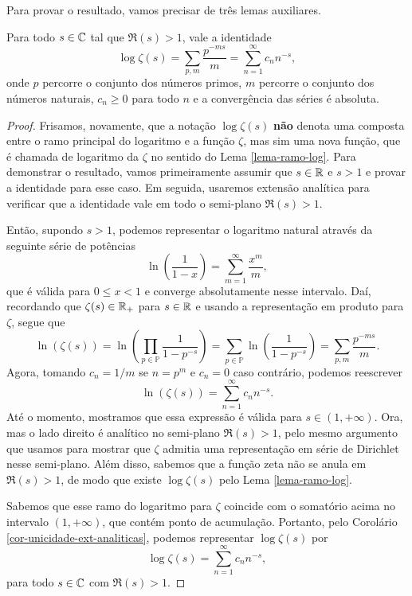     Para provar o resultado, vamos precisar de três lemas
    auxiliares.
    \begin{lema}
    \label{lema-log-zeta}
        Para todo $s\in\mathbb{C}$ tal que $\Re(s)>1$, vale a identidade
        \[
        \log\zeta(s) = \sum_{p,m} \frac{p^{-ms}}{m} 
                     = \sum_{n=1}^{\infty} c_nn^{-s},
        \]
        onde $p$ percorre o conjunto dos números primos, 
        $m$ percorre o conjunto dos números naturais,
        $c_n\geq 0$ para todo $n$ e a convergência das séries
        é absoluta.
    \end{lema}
    \begin{proof}
        Frisamos, novamente, que a notação $\log\zeta(s)$ \textbf{não} denota uma composta
        entre o ramo principal do logaritmo e a função $\zeta$, mas sim uma nova função, que
        é chamada de logaritmo da $\zeta$ no sentido do Lema \ref{lema-ramo-log}. 
        Para demonstrar o resultado, vamos primeiramente assumir que $s\in\mathbb{R}$ e $s>1$ e provar
        a identidade para esse caso. Em seguida, usaremos extensão analítica para verificar que a
        identidade vale em todo o semi-plano $\Re(s)>1$.
        
        Então, supondo $s>1$, podemos representar o logaritmo natural através da seguinte série 
        de potências
        \[
        \ln\left( \frac{1}{1-x} \right) = \sum_{m=1}^{\infty} \frac{x^m}{m},
        \]
        que é válida para $0\leq x < 1$ e converge absolutamente nesse intervalo. 
        Daí, recordando que $\zeta(s)\in\mathbb{R}_+$ para $s\in\mathbb{R}$
        e usando a representação em produto para $\zeta$, segue que
        \[
        \ln(\zeta(s)) = \ln\left( \prod_{p\in\mathbb{P}} \frac{1}{1 - p^{-s}} \right)
                      = \sum_{p\in\mathbb{P}} \ln\left( \frac{1}{1 - p^{-s}} \right)
                      = \sum_{p,m} \frac{p^{-ms}}{m}.
        \]
        Agora, tomando $c_n = 1/m$ se $n = p^m$ e $c_n = 0$ caso contrário, podemos reescrever
        \[
        \ln(\zeta(s)) = \sum_{n=1}^{\infty} c_n n^{-s}.
        \]
        Até o momento, mostramos que essa expressão é válida para $s\in(1, +\infty)$.
        Ora, mas o lado direito é analítico no semi-plano $\Re(s)>1$, pelo mesmo argumento que 
        usamos para mostrar que $\zeta$ admitia uma representação em série de Dirichlet nesse
        semi-plano. Além disso, sabemos que a função zeta não se anula em $\Re(s)>1$, de modo que
        existe $\log\zeta(s)$ pelo Lema \ref{lema-ramo-log}.
        
        Sabemos que esse ramo do logaritmo para $\zeta$ coincide com o somatório acima no intervalo
        $(1, +\infty)$, que contém ponto de acumulação. Portanto, pelo 
        Corolário \ref{cor-unicidade-ext-analiticas}, podemos representar $\log\zeta(s)$
        por
        \[
        \log\zeta(s) = \sum_{n=1}^{\infty} c_n n^{-s},
        \]
        para todo $s\in\mathbb{C}$ com $\Re(s)>1$.
    \end{proof}

